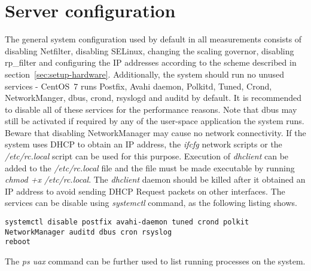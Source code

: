 
\section{Server configuration}\label{sec:setup-server}
The general system configuration used by default in all measurements
consists of disabling Netfilter, disabling SELinux, changing the scaling governor, disabling rp\_filter and
configuring the IP addresses according to the scheme described in section~\ref{sec:setup-hardware}.
Additionally, the system should run no unused services - CentOS~7 runs Postfix, Avahi daemon, Polkitd, Tuned, Crond,
NetworkManger, dbus, crond, rsyslogd and auditd by default.
It is recommended to disable all of these services for the performance reasons.
Note that dbus may still be activated if required by any of the user-space application the system runs.
Beware that disabling NetworkManager may cause no network connectivity.
If the system uses DHCP to obtain an IP address, the {\it{ifcfg}} network scripts or
the {\it{/etc/rc.local}} script can be used for this purpose.
Execution of {\it{dhclient}} can be added to the {\it{/etc/rc.local}} file and
the file must be made executable by running {\it{chmod +x /etc/rc.local}}.
The {\it{dhclient}} daemon should be killed after it obtained an IP address
to avoid sending DHCP Request packets on other interfaces.
The services can be disable using {\it{systemctl}} command, as the following listing shows.
\begin{lstlisting}
systemctl disable postfix avahi-daemon tuned crond polkit NetworkManager auditd dbus cron rsyslog
reboot
\end{lstlisting}
The {\it{ps uax}} command can be further used to list running processes on the system.
\\

